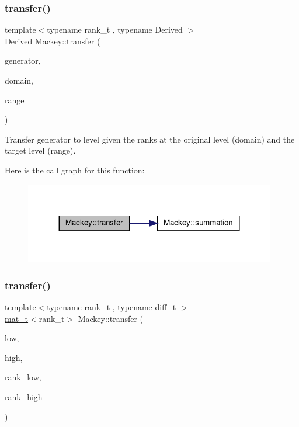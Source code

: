 \subsubsection{\texorpdfstring{transfer()}{transfer()}\hspace{0.1cm}{\footnotesize\ttfamily [5/6]}}
{\footnotesize\ttfamily template$<$typename rank\+\_\+t , typename Derived $>$ \\
Derived Mackey\+::transfer (\begin{DoxyParamCaption}\item[{const Eigen\+::\+Matrix\+Base$<$ Derived $>$ \&}]{generator,  }\item[{const rank\+\_\+t \&}]{domain,  }\item[{const rank\+\_\+t \&}]{range }\end{DoxyParamCaption})}



Transfer generator to level given the ranks at the original level (domain) and the target level (range). 

Here is the call graph for this function\+:\nopagebreak
\begin{figure}[H]
\begin{center}
\leavevmode
\includegraphics[width=311pt]{namespaceMackey_a0550bf97e47b3c319cb5e1bd81008d89_cgraph}
\end{center}
\end{figure}
\mbox{\label{namespaceMackey_abd5b370902e8b53b32e3fd4e329f068d}} 
\subsubsection{\texorpdfstring{transfer()}{transfer()}\hspace{0.1cm}{\footnotesize\ttfamily [6/6]}}
{\footnotesize\ttfamily template$<$typename rank\+\_\+t , typename diff\+\_\+t $>$ \\
\hyperlink{namespaceMackey_a035386035757dade630f685e508e5cf9}{mat\+\_\+t}$<$rank\+\_\+t$>$ Mackey\+::transfer (\begin{DoxyParamCaption}\item[{const \hyperlink{classMackey_1_1Homology}{Homology}$<$ rank\+\_\+t, diff\+\_\+t $>$ \&}]{low,  }\item[{const \hyperlink{classMackey_1_1Homology}{Homology}$<$ rank\+\_\+t, diff\+\_\+t $>$ \&}]{high,  }\item[{const rank\+\_\+t \&}]{rank\+\_\+low,  }\item[{const rank\+\_\+t \&}]{rank\+\_\+high }\end{DoxyParamCaption})}



